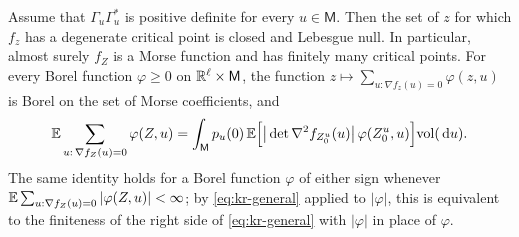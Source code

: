 \begin{proposition}\label{prop:kr-coefficient}
Assume that $\Gamma_u\Gamma_u^{*}$ is positive definite for every $u\in\mathsf M$. Then the set of $z$ for which $f_z$ has a degenerate critical point is closed and Lebesgue null. In particular, almost surely $f_Z$ is a Morse function and has finitely many critical points. For every Borel function $\varphi\ge0$ on $\mathbb R^\ell\times\mathsf M$, the function $z\mapsto\sum_{u:\nabla f_z(u)=0}\varphi(z,u)$ is Borel on the set of Morse coefficients, and
\begin{equation}\label{eq:kr-general}
\mathbb E\sum_{u:\,\nabla f_Z(u)=0}\varphi(Z,u)=\int_{\mathsf M}p_u(0)\,\mathbb E\Big[\big|\det\nabla^2f_{Z^u_0}(u)\big|\,\varphi(Z^u_0,u)\Big]\mathrm{vol}(\,\mathrm d u).
\end{equation}
The same identity holds for a Borel function $\varphi$ of either sign whenever $\mathbb E\sum_{u:\nabla f_Z(u)=0}|\varphi(Z,u)|<\infty$; by \eqref{eq:kr-general} applied to $|\varphi|$, this is equivalent to the finiteness of the right side of \eqref{eq:kr-general} with $|\varphi|$ in place of $\varphi$.
\end{proposition}

